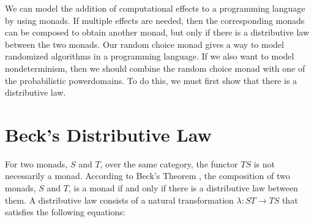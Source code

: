 
We can model the addition of computational effects to a programming language by using monads.  If multiple effects are needed, then the corresponding monads can be composed to obtain another monad, but only if there is a distributive law between the two monads.  Our random choice monad gives a way to model randomized algorithms in a programming language.  If we also want to model nondeterminism, then we should combine the random choice monad with one of the probabilistic powerdomains.  To do this, we must first show that there is a distributive law.

\section{Beck's Distributive Law}

For two monads, $S$ and $T$, over the same category, the functor $TS$ is not necessarily a monad.  According to Beck's Theorem \cite{beck1969distributive}, the composition of two monads, $S$ and $T$, is a monad if and only if there is a distributive law between them.  A distributive law consists of 
a natural transformation $\lambda :ST\rightarrow TS$ that satisfies the following equations:

